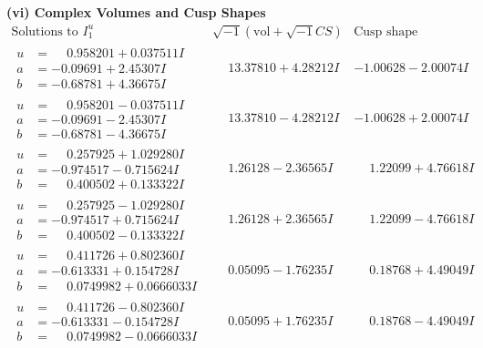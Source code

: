 \documentclass[1p]{elsarticle_modified}
\theoremstyle{definition}
\newcommand{\I}{\sqrt{-1}}
\begin{document}
\newpage\flushleft \textbf{(vi) Complex Volumes and Cusp Shapes}
$$\begin{array}{c|c|c}  
\text{Solutions to }I^u_{1}& \I (\text{vol} + \sqrt{-1}CS) & \text{Cusp shape}\\
 \hline 
\begin{aligned}
u &= \phantom{-}0.958201 + 0.037511 I \\
a &= -0.09691 + 2.45307 I \\
b &= -0.68781 + 4.36675 I\end{aligned}
 & \phantom{-}13.37810 + 4.28212 I & -1.00628 - 2.00074 I \\ \hline\begin{aligned}
u &= \phantom{-}0.958201 - 0.037511 I \\
a &= -0.09691 - 2.45307 I \\
b &= -0.68781 - 4.36675 I\end{aligned}
 & \phantom{-}13.37810 - 4.28212 I & -1.00628 + 2.00074 I \\ \hline\begin{aligned}
u &= \phantom{-}0.257925 + 1.029280 I \\
a &= -0.974517 - 0.715624 I \\
b &= \phantom{-}0.400502 + 0.133322 I\end{aligned}
 & \phantom{-}1.26128 - 2.36565 I & \phantom{-}1.22099 + 4.76618 I \\ \hline\begin{aligned}
u &= \phantom{-}0.257925 - 1.029280 I \\
a &= -0.974517 + 0.715624 I \\
b &= \phantom{-}0.400502 - 0.133322 I\end{aligned}
 & \phantom{-}1.26128 + 2.36565 I & \phantom{-}1.22099 - 4.76618 I \\ \hline\begin{aligned}
u &= \phantom{-}0.411726 + 0.802360 I \\
a &= -0.613331 + 0.154728 I \\
b &= \phantom{-}0.0749982 + 0.0666033 I\end{aligned}
 & \phantom{-}0.05095 - 1.76235 I & \phantom{-}0.18768 + 4.49049 I \\ \hline\begin{aligned}
u &= \phantom{-}0.411726 - 0.802360 I \\
a &= -0.613331 - 0.154728 I \\
b &= \phantom{-}0.0749982 - 0.0666033 I\end{aligned}
 & \phantom{-}0.05095 + 1.76235 I & \phantom{-}0.18768 - 4.49049 I \\ \hline\begin{aligned}

\end{aligned}
\end{array}$$
\end{document}
